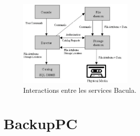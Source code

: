 \documentclass[a4paper,11pt]{report}
\begin{document}
\begin{figure} [h]
\begin {center}
\includegraphics[width=0.5\textwidth]{bacula.png}
\caption{Interactions entre les services Bacula.}
\end {center}
\end{figure}




\section{BackupPC}
\end{document}
